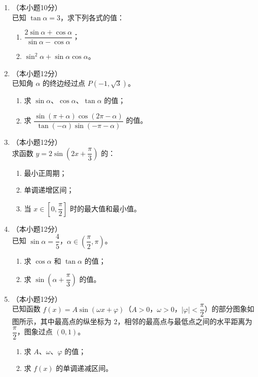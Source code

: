 \documentclass[12pt, a4paper]{ctexart}
\begin{document}
\begin{enumerate}[resume]
\item[17.]（本小题10分）\\
已知 $\tan\alpha=3$，求下列各式的值：
\begin{enumerate}[(1)]
  \item $\dfrac{2\sin\alpha+\cos\alpha}{\sin\alpha-\cos\alpha}$；
  \item $\sin^2\alpha+\sin\alpha\cos\alpha$。
\end{enumerate}

\vspace{6cm}

\item[18.]（本小题12分）\\
已知角 $\alpha$ 的终边经过点 $P(-1,\sqrt{3})$。
\begin{enumerate}[(1)]
  \item 求 $\sin\alpha$、$\cos\alpha$、$\tan\alpha$ 的值；
  \item 求 $\dfrac{\sin(\pi+\alpha)\cos(2\pi-\alpha)}{\tan(-\alpha)\sin(-\pi-\alpha)}$ 的值。
\end{enumerate}

\vspace{6cm}

\item[19.]（本小题12分）\\
求函数 $y=2\sin\!\left(2x+\dfrac{\pi}{3}\right)$ 的：
\begin{enumerate}[(1)]
  \item 最小正周期；
  \item 单调递增区间；
  \item 当 $x\in\left[0,\dfrac{\pi}{2}\right]$ 时的最大值和最小值。
\end{enumerate}

\vspace{6cm}

\item[20.]（本小题12分）\\
已知 $\sin\alpha=\dfrac{4}{5}$，$\alpha\in\left(\dfrac{\pi}{2},\pi\right)$。
\begin{enumerate}[(1)]
  \item 求 $\cos\alpha$ 和 $\tan\alpha$ 的值；
  \item 求 $\sin\!\left(\alpha+\dfrac{\pi}{3}\right)$ 的值。
\end{enumerate}

\vspace{6cm}

\item[21.]（本小题12分）\\
已知函数 $f(x)=A\sin(\omega x+\varphi)$（$A>0$，$\omega>0$，$|\varphi|<\dfrac{\pi}{2}$）的部分图象如图所示，其中最高点的纵坐标为 $2$，相邻的最高点与最低点之间的水平距离为 $\dfrac{\pi}{2}$，图象过点 $(0,1)$。
\begin{enumerate}[(1)]
  \item 求 $A$、$\omega$、$\varphi$ 的值；
  \item 求 $f(x)$ 的单调递减区间。
\end{enumerate}


\end{enumerate}
\end{document}
